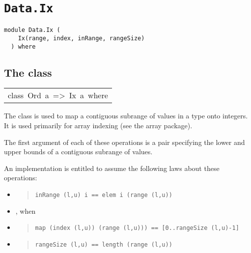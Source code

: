 \chapter{\texttt{Data.Ix}}
\label{module:Data.Ix}
\haddockbeginheader
{\haddockverb\begin{verbatim}
module Data.Ix (
    Ix(range, index, inRange, rangeSize)
  ) where\end{verbatim}}
\haddockendheader

\section{The  class
}
\begin{haddockdesc}
\item[\begin{tabular}{@{}l}
class\ Ord\ a\ =>\ Ix\ a\ where
\end{tabular}]\haddockbegindoc
The  class is used to map a contiguous subrange of values in
 a type onto integers.  It is used primarily for array indexing
 (see the array package).
\par
The first argument  of each of these operations is a pair
 specifying the lower and upper bounds of a contiguous subrange of values.
\par
An implementation is entitled to assume the following laws about these
 operations:
\par
\begin{itemize}
\item
\begin{quote}
{\haddockverb\begin{verbatim}
inRange (l,u) i == elem i (range (l,u))\end{verbatim}}
\end{quote}

\item
 , when 
\par

\item
\begin{quote}
{\haddockverb\begin{verbatim}
map (index (l,u)) (range (l,u))) == [0..rangeSize (l,u)-1]\end{verbatim}}
\end{quote}

\item
\begin{quote}
{\haddockverb\begin{verbatim}
rangeSize (l,u) == length (range (l,u))\end{verbatim}}
\end{quote}


\end{itemize}
\end{haddockdesc}
